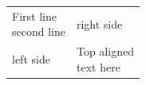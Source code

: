 \documentclass{article}
\begin{document}
\begin{tabular}{ll}
\pbox{\textwidth}{First line \\ second line} & right side \\
left side & \pbox[t]{\textwidth}{Top aligned \\ text here} \\
\end{tabular}
\end{document}
